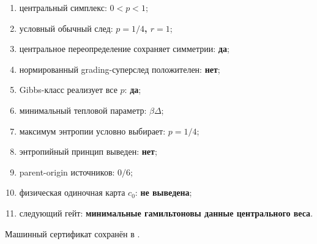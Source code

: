\begin{protocol}\begin{enumerate}
\item центральный симплекс: \textbf{$0<p<1$};
\item условный обычный след: \textbf{$p=1/4$, $r=1$};
\item центральное переопределение сохраняет симметрии: \textbf{да};
\item нормированный grading-суперслед положителен: \textbf{нет};
\item Gibbs-класс реализует все $p$: \textbf{да};
\item минимальный тепловой параметр: \textbf{$\beta\Delta$};
\item максимум энтропии условно выбирает: \textbf{$p=1/4$};
\item энтропийный принцип выведен: \textbf{нет};
\item parent-origin источников: \textbf{$0/6$};
\item физическая одиночная карта $c_0$: \textbf{не выведена};
\item следующий гейт: \textbf{минимальные гамильтоновы данные центрального веса}.
\end{enumerate}\end{protocol}

Машинный сертификат сохранён в
.